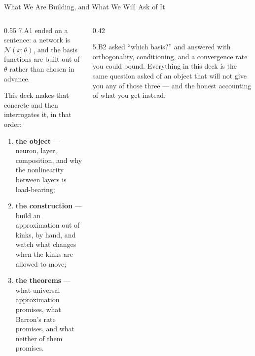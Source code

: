 \begin{frame}{What We Are Building, and What We Will Ask of It}
\begin{columns}[T]
\begin{column}{0.55\textwidth}
\small
7.A1 ended on a sentence: a network is $\mathcal{N}(x;\theta)$, and the basis functions are built out of $\theta$ rather than chosen in advance.
\medskip

This deck makes that concrete and then interrogates it, in that order:
\begin{enumerate}\small\setlength{\itemsep}{1.1mm}
  \item \textbf{the object} --- neuron, layer, composition, and why the nonlinearity between layers is load-bearing;
  \item \textbf{the construction} --- build an approximation out of kinks, by hand, and watch what changes when the kinks are allowed to move;
  \item \textbf{the theorems} --- what universal approximation promises, what Barron's rate promises, and what neither of them promises.
\end{enumerate}
\end{column}
\begin{column}{0.42\textwidth}
\begin{conceptbox}[title=\textbf{The comparison to keep}]\small
5.B2 asked ``which basis?'' and answered with orthogonality, conditioning, and a convergence rate you could bound.
\medskip
Everything in this deck is the same question asked of an object that will not give you any of those three --- and the honest accounting of what you get instead.
\end{conceptbox}
\end{column}
\end{columns}
\end{frame}

